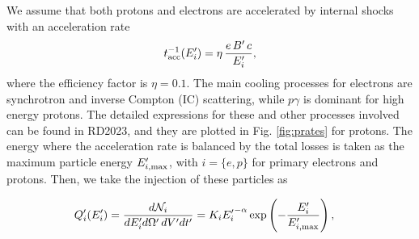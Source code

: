 \documentclass[baaa]{baaa}
\newcommand{\be}{\begin{eqnarray}}
\newcommand{\ee}{\end{eqnarray}}
\begin{document}
We assume that both protons and electrons are accelerated by internal shocks with an acceleration rate
\be
t_{\rm acc}^{-1}(E'_i)=\eta\,\frac{  e\, B' \,c}{E'_i},
\ee 
where the efficiency factor is $\eta=0.1$. The main cooling processes for electrons are synchrotron and inverse Compton (IC) scattering, while $p\gamma$ is dominant for high energy protons. The detailed expressions for these and other processes involved can be found in RD2023, and they are plotted in Fig. \ref{fig:prates} for protons. The energy where the acceleration rate is balanced by the total losses is taken as the maximum particle energy $E'_{i,\rm max}$, with $i=\{e,p\}$ for primary electrons and protons. 
Then, we take the injection of these particles as

\be 
Q'_i(E'_i) &= \frac{d\mathcal{N}_i}{dE'_i d\Omega'\,dV'dt'}
= K_i{E'_i}^{-\alpha} \exp\left(-\frac{E'_i}{E'_{i,\rm max}}\right),
\ee
\end{document}
